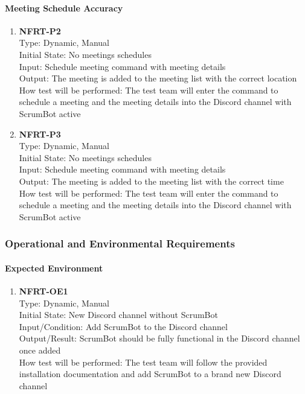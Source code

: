 \documentclass[12pt, titlepage]{article}
\begin{document}
\paragraph{Meeting Schedule Accuracy}
\begin{enumerate}
\item{\textbf{NFRT-P2}}\\
Type: Dynamic, Manual\\
Initial State: No meetings schedules\\
Input: Schedule meeting command with meeting details\\
Output: The meeting is added to the meeting list with the correct location\\
How test will be performed: The test team will enter the command to schedule a meeting and the meeting details into the Discord channel with ScrumBot active
\item{\textbf{NFRT-P3}}\\
Type: Dynamic, Manual\\
Initial State: No meetings schedules\\
Input: Schedule meeting command with meeting details\\
Output: The meeting is added to the meeting list with the correct time\\
How test will be performed: The test team will enter the command to schedule a meeting and the meeting details into the Discord channel with ScrumBot active
\end{enumerate}

\subsubsection{Operational and Environmental Requirements}
\paragraph{Expected Environment}
\begin{enumerate}

\item{\textbf{NFRT-OE1}}\\
Type: Dynamic, Manual\\
Initial State: New Discord channel without ScrumBot\\
Input/Condition: Add ScrumBot to the Discord channel\\
Output/Result: ScrumBot should be fully functional in the Discord channel once added\\
How test will be performed: The test team will follow the provided installation documentation and add ScrumBot to a brand new Discord channel
\end{enumerate}
\end{document}
